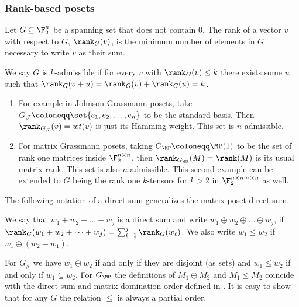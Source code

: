 \subsubsection{Rank-based posets}
Let \(G \subseteq \F_2^n\) be a spanning set that does not contain \(0\). The rank of a vector \(v\) with respect to \(G\), \(\rank_G(v)\), is the minimum number of elements in \(G\) necessary to write \(v\) as their sum. %
\begin{definition}
We say \(G\) is \(k\)-admissible if for every \(v\) with \(\rank_G(v) \leq k\) there exists some \(u\) such that \(\rank_G(v+u) =\rank_G(v)+\rank_G(u) =k\).
\end{definition}

\begin{example}
\begin{enumerate}
    \item For example in Johnson Grassmann posets, take \(G_{\mathcal{J}} \coloneqq \set{e_1,e_2,\dots,e_n}\) to be the standard basis. Then \(\rank_{G_{\mathcal{J}}}(v)=wt(v)\) is just its Hamming weight. This set is \(n\)-admissible. 
    \item For matrix Grassmann posets, taking \(G_{\MP}\coloneqq \MP(1)\) to be the set of rank one matrices inside \(\F_2^{n \times n}\), then \(\rank_{G_{\MP}}(M) = \rank(M)\) is its usual matrix rank. This set is also \(n\)-admissible. This second example can be extended to \(G\) being the rank one \(k\)-tensors for \(k > 2\) in \(\F_2^{n\times n \dots \times n}\) as well. 
\end{enumerate}    
\end{example}

The following notation of a direct sum generalizes the matrix poset direct sum.
\begin{definition}
    We say that \(w_1+w_2+\dots+w_j\) is a direct sum and write \(w_1\oplus w_2 \oplus \dots \oplus w_j\), if \(\rank_G(w_1 + w_2 + \dots +w_j) = \sum_{\ell=1}^j \rank_G(w_\ell)\). We also write \(w_1 \leq w_2\) if \(w_1 \oplus (w_2-w_1)\).
\end{definition}
For \(G_{\mathcal{J}}\) we have \(w_1 \oplus w_2\) if and only if they are disjoint (as sets) and \(w_1 \leq w_2\) if and only if \(w_1 \subseteq w_2\). For \(G_{\MP}\) the definitions of \(M_1 \oplus M_2\) and \(M_1 \leq M_2\) coincide with the direct sum and matrix domination order defined in . It is easy to show that for any \(G\) the relation \(\leq\) is always a partial order.%

